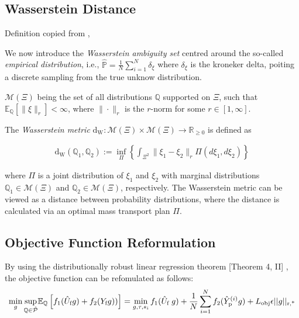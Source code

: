 \documentclass[12pt, a4paper]{article}
\begin{document}
\subsection{Wasserstein Distance}
Definition copied from \cite{coulson2021distributionally},

We now introduce the \textit{Wasserstein ambiguity set} centred around the so-called \textit{empirical distribution}, i.e., $\mathbb{\hat{P}} = \frac{1}{N}\sum_{i=1}^{N}\delta_{\xi}$ \cite{mohajerin2018data} where $\delta_{\xi}$ is the kroneker delta, poiting a discrete sampling from the true unknow distribution. 

\noindent  $\mathcal{M}(\Xi)$ being the set of all distributions $\mathbb{Q}$ supported on $\Xi$, such that $\mathbb{E}_\mathbb{Q}[\|\xi\|_r] < \infty$, where $\|\cdot\|_r$ is the $r$-norm for some $r \in [1,\infty]$.


The \textit{Wasserstein metric} $\text{d}_\text{W}: \mathcal{M}(\Xi) \times \mathcal{M}(\Xi) \to \mathbb{R}_{\geq 0}$ is defined as

\begin{align}
    \text{d}_\text{W}(\mathbb{Q}_1, \mathbb{Q}_2) := \inf_{\Pi} \left\{\int_{\Xi^2} \|\xi_1 - \xi_2\|_r \Pi(d\xi_1, d\xi_2)\right\}    
\end{align}


\noindent where $\Pi$ is a joint distribution of $\xi_1$ and $\xi_2$ with marginal distributions $\mathbb{Q}_1 \in \mathcal{M}(\Xi)$ and $\mathbb{Q}_2 \in \mathcal{M}(\Xi)$, respectively.
The Wasserstein metric can be viewed as a distance between probability distributions, where the distance is calculated via an optimal mass transport plan $\Pi$.

\subsection{Objective Function Reformulation}
By using the distributionally robust linear regression theorem [Theorem 4, II] \cite{shafieezadeh2019regularization}, the objective function can be refomulated as follows: 
\begin{align}
    \min_{g} \sup_{\mathbb{Q} \in \hat{\mathcal{P}}}& \mathbb{E}_\mathbb{Q} \left[f_1(\hat{U}_\text{f}g) + f_2(Y_\text{f}g))\right] = \min_{g, \tau, s_i} f_1(\hat{U}_{\text{f}}\;g) + \frac{1}{N}\sum_{i=1}^{N}f_2(\hat{Y}_{\text{p}}^{(i)}g) + L_{\text{obj}}\epsilon ||g||_{\text{r,*}}\notag \\[0.5cm] 
\end{align}
\end{document}
